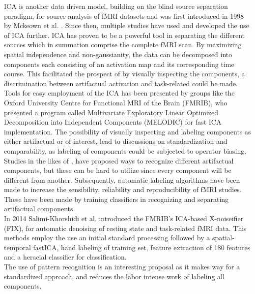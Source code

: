 ICA is another data driven model, building on the blind source separation paradigm, for source analysis of fMRI datasets and was first introduced in 1998 by Mckeown et al. \cite{Mckeown1998}. Since then, multiple studies \cite{Calhoun2001a,Deslauriers2017,Parkes2018,Du2018,Tohka2008} have used and developed the use of ICA further. ICA has proven to be a powerful tool in separating the different sources which in summation comprise the complete fMRI scan. By maximizing spatial independence and non-gaussianity, the data can be decomposed into components each consisting of an activation map and its corresponding time course. \cite{Salimi-Khorshidi2014} This facilitated the prospect of by visually inspecting the components, a discrimination between artifactual activation and task-related could be made. Tools for easy employment of the ICA has been presented by groups like the Oxford University Centre for Functional MRI of the Brain (FMRIB), who presented a program called Multivariate Exploratory Linear Optimized Decomposition into Independent Components (MELODIC) for fast ICA implementation. \cite{FMRIB2016} The possibility of visually inspecting and labeling components as either artifactual or of interest, lead to discussions on standardization and comparability, as labeling of components could be subjected to operator biasing. Studies in the likes of \cite{Salimi-Khorshidi2014,Griffanti2017}, have proposed ways to recognize different artifactual components, but these can be hard to utilize since every component will be different from another. Subsequently, automatic labeling algorithms have been made to increase the sensibility, reliability and reproducibility of fMRI studies. These have been made by training classifiers in recognizing and separating artifactual components. \cite{Tohka2008} \\
In 2014 Salimi-Khorshidi et al. \cite{Salimi-Khorshidi2014} introduced the FMRIB's ICA-based X-noiseifier (FIX), for automatic denoising of resting state and task-related fMRI data. This methods employ the use an initial standard processing followed by a spatial-temporal fastICA, hand labeling of training set, feature extraction of 180 features and a heracial classifier for classification. \cite{Salimi-Khorshidi2014} \\
The use of pattern recognition is an interesting proposal as it makes way for a standardized approach, and reduces the labor intense work of labeling all components.   

